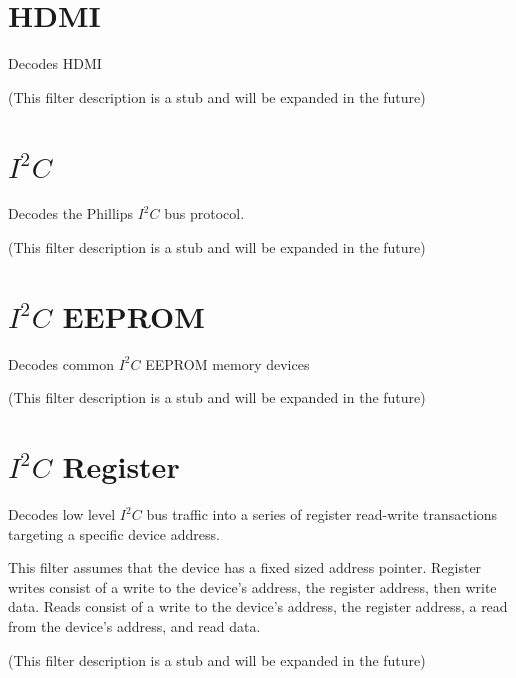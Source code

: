 \section{HDMI}
\label{filter:hdmi}

Decodes HDMI

(This filter description is a stub and will be expanded in the future)

\pagebreak
\section{$I^2C$}

Decodes the Phillips $I^2C$ bus protocol.

(This filter description is a stub and will be expanded in the future)

\pagebreak
\section{$I^2C$ EEPROM}
\label{filter:i2ceeprom}

Decodes common $I^2C$ EEPROM memory devices

(This filter description is a stub and will be expanded in the future)

\pagebreak
\section{$I^2C$ Register}

Decodes low level $I^2C$ bus traffic into a series of register read-write transactions targeting a specific device
address.

This filter assumes that the device has a fixed sized address pointer. Register writes consist of a write to the
device's address, the register address, then write data. Reads consist of a write to the device's address, the register
address, a read from the device's address, and read data.

(This filter description is a stub and will be expanded in the future)

\pagebreak
